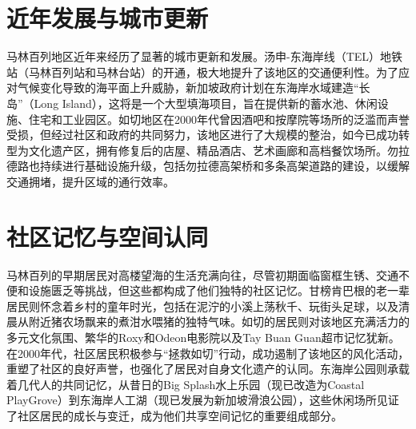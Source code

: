 \documentclass[11pt,a4paper,twoside,openany]{book}
\begin{document}
\section{近年发展与城市更新}
马林百列地区近年来经历了显著的城市更新和发展。汤申-东海岸线（TEL）地铁站（马林百列站和马林台站）的开通，极大地提升了该地区的交通便利性。为了应对气候变化导致的海平面上升威胁，新加坡政府计划在东海岸水域建造“长岛”（Long Island），这将是一个大型填海项目，旨在提供新的蓄水池、休闲设施、住宅和工业园区。如切地区在2000年代曾因酒吧和按摩院等场所的泛滥而声誉受损，但经过社区和政府的共同努力，该地区进行了大规模的整治，如今已成功转型为文化遗产区，拥有修复后的店屋、精品酒店、艺术画廊和高档餐饮场所。勿拉德路也持续进行基础设施升级，包括勿拉德高架桥和多条高架道路的建设，以缓解交通拥堵，提升区域的通行效率。

\section{社区记忆与空间认同}
马林百列的早期居民对高楼望海的生活充满向往，尽管初期面临窗框生锈、交通不便和设施匮乏等挑战，但这些都构成了他们独特的社区记忆。甘榜肯巴根的老一辈居民则怀念着乡村的童年时光，包括在泥泞的小溪上荡秋千、玩街头足球，以及清晨从附近猪农场飘来的煮泔水喂猪的独特气味。如切的居民则对该地区充满活力的多元文化氛围、繁华的Roxy和Odeon电影院以及Tay Buan Guan超市记忆犹新。在2000年代，社区居民积极参与“拯救如切”行动，成功遏制了该地区的风化活动，重塑了社区的良好声誉，也强化了居民对自身文化遗产的认同。东海岸公园则承载着几代人的共同记忆，从昔日的Big Splash水上乐园（现已改造为Coastal PlayGrove）到东海岸人工湖（现已发展为新加坡滑浪公园），这些休闲场所见证了社区居民的成长与变迁，成为他们共享空间记忆的重要组成部分。
\end{document}
